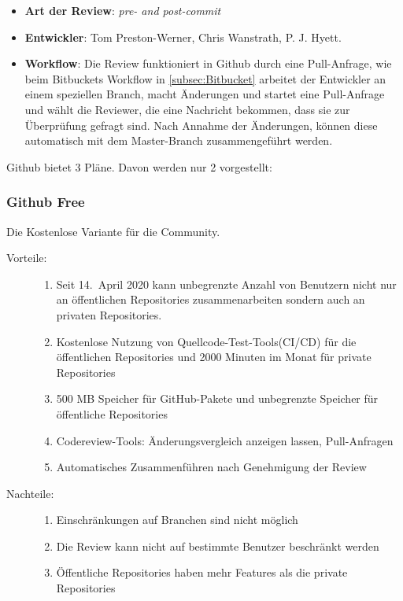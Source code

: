 \begin{itemize}
	\item \textbf{Art der Review}: \textit{pre- and post-commit}
	\item \textbf{Entwickler}: Tom Preston-Werner, Chris Wanstrath, P. J. Hyett.
	\item \textbf{Workflow}: Die Review funktioniert in Github durch eine Pull-Anfrage, wie beim Bitbuckets Workflow in \cref{subsec:Bitbucket} arbeitet der Entwickler an einem
		speziellen Branch, macht Änderungen und startet eine Pull-Anfrage und wählt die Reviewer, die eine Nachricht bekommen, dass sie zur Überprüfung gefragt sind. Nach Annahme der
		Änderungen, können diese automatisch mit dem Master-Branch zusammengeführt werden.
\end{itemize}

Github bietet 3 Pläne. Davon werden nur 2 vorgestellt:

\subsubsection{Github Free}
\label{subsubsec:Free}

Die Kostenlose Variante für die Community.
\begin{description}
	\item [Vorteile:] \hfill
	\begin{enumerate}
		\item Seit 14.~April 2020 kann unbegrenzte Anzahl von Benutzern nicht nur an öffentlichen Repositories zusammenarbeiten sondern auch an privaten Repositories.
		\item Kostenlose Nutzung von Quellcode-Test-Tools(\ac{CI}/\ac{CD}) für die öffentlichen Repositories und 2000 Minuten im Monat für private Repositories
		\item 500 MB Speicher für GitHub-Pakete und unbegrenzte Speicher für öffentliche Repositories
		\item Codereview-Tools: Änderungsvergleich anzeigen lassen, Pull-Anfragen
		\item Automatisches Zusammenführen nach Genehmigung der Review
	\end{enumerate}
	\item [Nachteile:] \hfill
	\begin{enumerate}
		\item Einschränkungen auf Branchen sind nicht möglich
		\item Die Review kann nicht auf bestimmte Benutzer beschränkt werden
		\item Öffentliche Repositories haben mehr Features als die private Repositories
	\end{enumerate}
\end{description}


